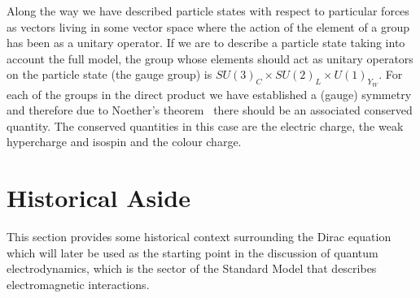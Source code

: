 Along the way we have described particle states with respect to particular
forces as vectors living in some vector space where the action of the element of
a group has been as a unitary operator. If we are to describe a particle state
taking into account the full model, the group whose elements should act as
unitary operators on the particle state (the gauge group) is $SU{(3)}_{C} \times
SU{(2)}_{L} \times U{(1)}_{Y_{W}}$. For each of the groups in the direct product
we have established a (gauge) symmetry and therefore due to Noether's
theorem~\cite{Noether_1971} there should be an associated conserved quantity.
The conserved quantities in this case are the electric charge, the weak
hypercharge and isospin and the colour charge.

\clearpage
\newpage

\section{Historical Aside}%
\label{sec:history}

This section provides some historical context surrounding the Dirac equation
which will later be used as the starting point in the discussion of quantum
electrodynamics, which is the sector of the Standard Model that describes
electromagnetic interactions.

